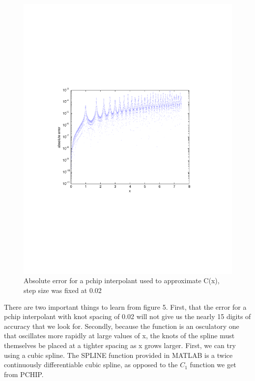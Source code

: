 \documentclass[a4paper,11pt]{article}
\begin{document}
\begin{figure}
\centering
    \includegraphics[width=5in]{pchiperrors.pdf}
        \caption{Absolute error for a pchip interpolant used to approximate C(x), step size was fixed at 0.02}
\end{figure}

There are two important things to learn from figure 5. First, that the error for a pchip interpolant with knot spacing of 0.02 will not give us the nearly 15 digits of accuracy that we look for. Secondly, because the function is an osculatory one that oscillates more rapidly at large values of x, the knots of the spline must themselves be placed at a tighter spacing as x grows larger. First, we can try using a cubic spline. The SPLINE function provided in MATLAB is a twice continuously differentiable cubic spline, as opposed to the $C_1$ function we get from PCHIP.
\end{document}

